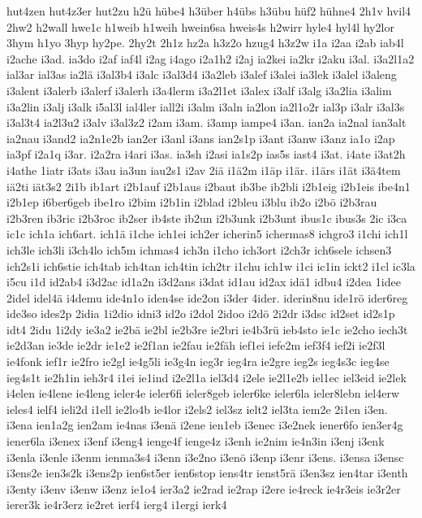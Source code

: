 {hut4zen
hut4z3er
hut2zu
h2ü
hübe4
h3über
h4übs
h3übu
hüf2
hühne4
2h1v
hvil4
2hw2
h2wall
hwe1c
h1weib
h1weih
hwein6sa
hweis4s
h2wirr
hyle4
hyl4l
hy2lor
3hym
h1yo
3hyp
hy2pe.
2hy2t
2h1z
hz2a
h3z2o
hzug4
h3z2w
i1a
i2aa
i2ab
iab4l
i2ache
i3ad.
ia3do
i2af
iaf4l
i2ag
i4ago
i2a1h2
i2aj
ia2kei
ia2kr
i2aku
i3al.
i3a2l1a2
ial3ar
ial3as
ia2lä
i3al3b4
i3alc
i3al3d4
i3a2leb
i3alef
i3alei
ia3lek
i3alel
i3aleng
i3alent
i3alerb
i3alerf
i3alerh
i3a4lerm
i3a2l1et
i3alex
i3alf
i3alg
i3a2lia
i3alim
i3a2lin
i3alj
i3alk
i5al3l
ial4ler
iall2i
i3alm
i3aln
ia2lon
ia2l1o2r
ial3p
i3alr
i3al3s
i3al3t4
ia2l3u2
i3alv
i3al3z2
i2am
i3am.
i3amp
iampe4
i3an.
ian2a
ia2nal
ian3alt
ia2nau
i3and2
ia2n1e2b
ian2er
i3anl
i3ans
ian2s1p
i3ant
i3anw
i3anz
ia1o
i2ap
ia3pf
i2a1q
i3ar.
i2a2ra
i4ari
i3as.
ia3sh
i2asi
ia1s2p
ias5s
iast4
i3at.
i4ate
i3at2h
i4athe
1iatr
i3ats
i3au
ia3un
iau2s1
i2av
2iä
i1ä2m
i1äp
i1är.
i1ärs
i1ät
i3ä4tem
iä2ti
iät3s2
2i1b
ib1art
i2b1auf
i2b1aus
i2baut
ib3be
ib2bli
i2b1eig
i2b1eis
ibe4n1
i2b1ep
i6ber6geb
ibe1ro
i2bim
i2b1in
i2blad
i2bleu
i3blu
ib2o
i2bö
i2b3rau
i2b3ren
ib3ric
i2b3roc
ib2ser
ib4ste
ib2un
i2b3unk
i2b3unt
ibus1c
ibus3s
2ic
i3ca
ic1c
ich1a
ich6art.
ich1ä
i1che
ich1ei
ich2er
icherin5
ichermas8
ichgro3
i1chi
ich1l
ich3le
ich3li
i3ch4lo
ich5m
ichmas4
ich3n
i1cho
ich3ort
i2ch3r
ich6sele
ichsen3
ich2s1i
ich6stie
ich4tab
ich4tan
ich4tin
ich2tr
i1chu
ich1w
i1ci
ic1in
ickt2
i1cl
ic3la
i5cu
i1d
id2ab4
i3d2ac
id1a2n
i3d2ans
i3dat
id1au
id2ax
idä1
idbu4
i2dea
1idee
2idel
idel4ä
i4demu
ide4n1o
iden4se
ide2on
i3der
4ider.
iderin8nu
ide1rö
ider6reg
ide3so
ides2p
2idia
1i2dio
idni3
id2o
i2dol
2idoo
i2dö
2i2dr
i3dsc
id2set
id2s1p
idt4
2idu
1i2dy
ie3a2
ie2bä
ie2bl
ie2b3re
ie2bri
ie4b3rü
ieb4sto
ie1c
ie2cho
iech3t
ie2d3an
ie3de
ie2dr
ie1e2
ie2f1an
ie2fau
ie2fäh
ief1ei
iefe2m
ief3f4
ief2i
ie2f3l
ie4fonk
ief1r
ie2fro
ie2gl
ie4g5li
ie3g4n
ieg3r
ieg4ra
ie2gre
ieg2s
ieg4s3c
ieg4se
ieg4s1t
ie2h1in
ieh3r4
i1ei
ie1ind
i2e2l1a
iel3d4
i2ele
ie2l1e2b
iel1ec
iel3eid
ie2lek
i4elen
ie4lene
ie4leng
ieler4e
ieler6fi
ieler8geb
ieler6ke
ieler6la
ieler8lebn
iel4erw
ieles4
ielf4
ieli2d
i1ell
ie2lo4b
ie4lor
i2els2
iel3sz
ielt2
iel3ta
iem2e
2i1en
i3en.
i3ena
ien1a2g
ien2am
ie4nas
i3enä
i2ene
ien1eb
i3enec
i3e2nek
iener6fo
ien3er4g
iener6la
i3enex
i3enf
i3eng4
ienge4f
ienge4z
i3enh
ie2nim
ie4n3in
i3enj
i3enk
i3enla
i3enle
i3enm
ienma3s4
i3enn
i3e2no
i3enö
i3enp
i3enr
i3ens.
i3ensa
i3ensc
i3ens2e
ien3s2k
i3ens2p
ien6st5er
ien6stop
iens4tr
ienst5rä
i3en3sz
ien4tar
i3enth
i3enty
i3env
i3enw
i3enz
ie1o4
ier3a2
ie2rad
ie2rap
i2ere
ie4reck
ie4r3eis
ie3r2er
ierer3k
ie4r3erz
ie2ret
ierf4
ierg4
i1ergi
ierk4
}
